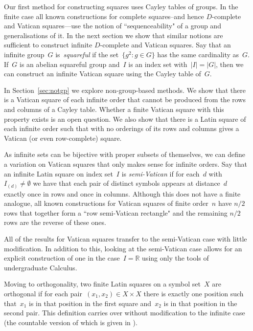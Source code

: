 \documentclass[12pt,a4paper]{article}
\newcommand{\R}{\mathbb{R}}
\begin{document}
Our first method for constructing squares uses Cayley tables of groups.   In the finite case all known constructions for complete squares--and hence $D$-complete and Vatican squares---use the notion of ``sequenceability" of a group and generalisations of it.  In the next section we show that similar notions are sufficient to construct infinite $D$-complete and Vatican  squares.  Say that an infinite group~$G$ is~{\em squareful} if the set~$\{ g^2 : g \in G\}$ has the same cardinality as~$G$.  If~$G$ is an abelian squareful group and~$I$ is an index set with~$|I| = |G|$, then we can construct an infinite Vatican square using the Cayley table of~$G$. 

In Section~\ref{sec:notgp} we explore non-group-based methods.  We show that there is a Vatican square of each infinite order that cannot be produced from the rows and columns of a Cayley table.  Whether a finite Vatican square with this property exists is an open question.  We also show that there is a Latin square of each infinite order such that with no orderings of its rows and columns gives a Vatican (or even row-complete) square.


As infinite sets can be bijective with proper subsets of themselves, we can define a variation on Vatican squares that only makes sense for infinite orders.
Say that an infinite Latin square on index set~$I$ is {\em semi-Vatican} if for each~$d$ with~$I_{(d)} \neq \emptyset$ we have that each pair of distinct symbols appears at distance~$d$ exactly once in rows and once in columns.  Although this does not have a finite analogue, all known constructions for Vatican squares of finite order~$n$ have $n/2$ rows that together form a ``row semi-Vatican rectangle" and the remaining $n/2$ rows are the reverse of these ones.

All of the results for Vatican squares transfer to the semi-Vatican case with little modification.  In addition to this, looking at the semi-Vatican case allows for an explicit construction of one in the case~$I = \R$ using only the tools of undergraduate Calculus.


Moving to orthogonality, two finite Latin squares on a symbol set~$X$ are orthogonal if for  each pair~$(x_1, x_2) \in X \times X$ there is exactly one position such that~$x_1$ is in that position in the first square and~$x_2$ is in that position in the second pair.  This definition carries over without modification to the infinite case (the countable version of which is given in \cite[p.~116]{DK15}).
\end{document}
